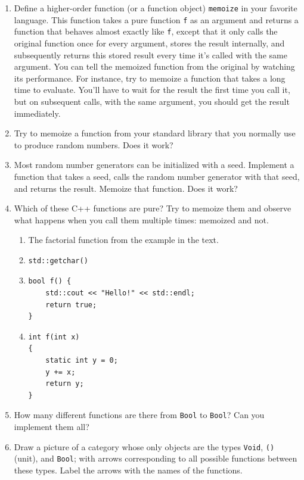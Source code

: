 \begin{enumerate}
\tightlist
\item
  Define a higher-order function (or a function object) \texttt{memoize}
  in your favorite language. This function takes a pure function
  \texttt{f} as an argument and returns a function that behaves almost
  exactly like \texttt{f}, except that it only calls the original
  function once for every argument, stores the result internally, and
  subsequently returns this stored result every time it's called with
  the same argument. You can tell the memoized function from the
  original by watching its performance. For instance, try to memoize a
  function that takes a long time to evaluate. You'll have to wait for
  the result the first time you call it, but on subsequent calls, with
  the same argument, you should get the result immediately.
\item
  Try to memoize a function from your standard library that you normally
  use to produce random numbers. Does it work?
\item
  Most random number generators can be initialized with a seed.
  Implement a function that takes a seed, calls the random number
  generator with that seed, and returns the result. Memoize that
  function. Does it work?
\item
  Which of these C++ functions are pure? Try to memoize them and observe
  what happens when you call them multiple times: memoized and not.

  \begin{enumerate}
  \tightlist
  \item
    The factorial function from the example in the text.
  \item
\begin{verbatim}
std::getchar()
\end{verbatim}
  \item
\begin{verbatim}
bool f() { 
    std::cout << "Hello!" << std::endl;
    return true;
}
\end{verbatim}
  \item
\begin{verbatim}
int f(int x)
{
    static int y = 0;
    y += x;
    return y;
}
\end{verbatim}
  \end{enumerate}
\item
  How many different functions are there from \texttt{Bool} to
  \texttt{Bool}? Can you implement them all?
\item
  Draw a picture of a category whose only objects are the types
  \texttt{Void}, \texttt{()} (unit), and \texttt{Bool}; with arrows
  corresponding to all possible functions between these types. Label the
  arrows with the names of the functions.
\end{enumerate}
